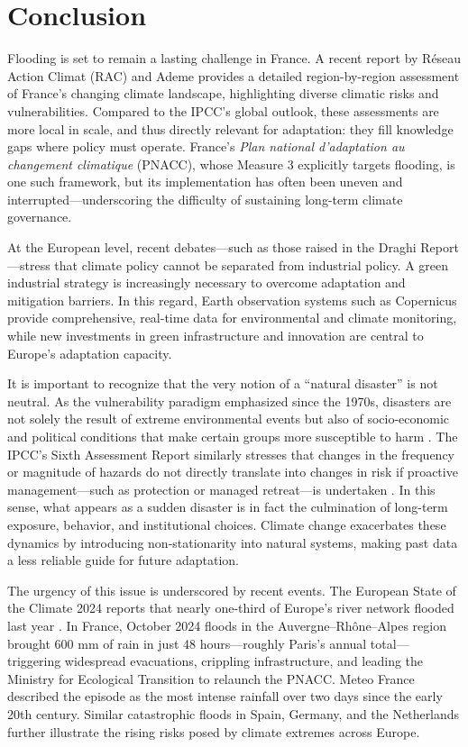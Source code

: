 \chapter{Conclusion}
\label{ch: conclusion}


Flooding is set to remain a lasting challenge in France. A recent report by Réseau Action Climat (RAC) and Ademe \cite{RAC2024} provides a detailed region-by-region assessment of France’s changing climate landscape, highlighting diverse climatic risks and vulnerabilities. Compared to the IPCC’s global outlook, these assessments are more local in scale, and thus directly relevant for adaptation: they fill knowledge gaps where policy must operate. France’s \emph{Plan national d’adaptation au changement climatique} (PNACC), whose Measure 3 explicitly targets flooding, is one such framework, but its implementation has often been uneven and interrupted—underscoring the difficulty of sustaining long-term climate governance.

At the European level, recent debates—such as those raised in the Draghi Report—stress that climate policy cannot be separated from industrial policy. A green industrial strategy is increasingly necessary to overcome adaptation and mitigation barriers. In this regard, Earth observation systems such as Copernicus provide comprehensive, real-time data for environmental and climate monitoring, while new investments in green infrastructure and innovation are central to Europe’s adaptation capacity.

It is important to recognize that the very notion of a “natural disaster” is not neutral. As the vulnerability paradigm emphasized since the 1970s, disasters are not solely the result of extreme environmental events but also of socio-economic and political conditions that make certain groups more susceptible to harm \citep{nations2010natural}. The IPCC’s Sixth Assessment Report similarly stresses that changes in the frequency or magnitude of hazards do not directly translate into changes in risk if proactive management—such as protection or managed retreat—is undertaken \citep{Reisinger2020Concept}. In this sense, what appears as a sudden disaster is in fact the culmination of long-term exposure, behavior, and institutional choices. Climate change exacerbates these dynamics by introducing non-stationarity into natural systems, making past data a less reliable guide for future adaptation.

The urgency of this issue is underscored by recent events. The European State of the Climate 2024 reports that nearly one-third of Europe’s river network flooded last year \citep{copernicus2024esotc}. In France, October 2024 floods in the Auvergne–Rhône–Alpes region brought 600 mm of rain in just 48 hours—roughly Paris’s annual total—triggering widespread evacuations, crippling infrastructure, and leading the Ministry for Ecological Transition to relaunch the PNACC. Meteo France described the episode as the most intense rainfall over two days since the early 20th century. Similar catastrophic floods in Spain, Germany, and the Netherlands further illustrate the rising risks posed by climate extremes across Europe.

